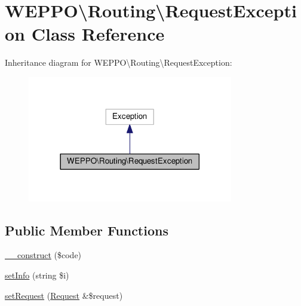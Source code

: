 \hypertarget{classWEPPO_1_1Routing_1_1RequestException}{}\section{W\+E\+P\+PO\textbackslash{}Routing\textbackslash{}Request\+Exception Class Reference}
\label{classWEPPO_1_1Routing_1_1RequestException}


Inheritance diagram for W\+E\+P\+PO\textbackslash{}Routing\textbackslash{}Request\+Exception\+:\nopagebreak
\begin{figure}[H]
\begin{center}
\leavevmode
\includegraphics[width=254pt]{classWEPPO_1_1Routing_1_1RequestException__inherit__graph}
\end{center}
\end{figure}
\subsection*{Public Member Functions}
\begin{DoxyCompactItemize}
\item 
\hyperlink{classWEPPO_1_1Routing_1_1RequestException_a0cd85c2f8df0eb7e959ab7b16df6d274}{\+\_\+\+\_\+construct} (\$code)
\item 
\hyperlink{classWEPPO_1_1Routing_1_1RequestException_a7aeb17bf0884ec5c3e36edd5f45c056a}{set\+Info} (string \$i)
\item 
\hyperlink{classWEPPO_1_1Routing_1_1RequestException_acfaa0ce2b398420cc728027072d3c359}{set\+Request} (\hyperlink{classWEPPO_1_1Routing_1_1Request}{Request} \&\$request)
\end{DoxyCompactItemize}
